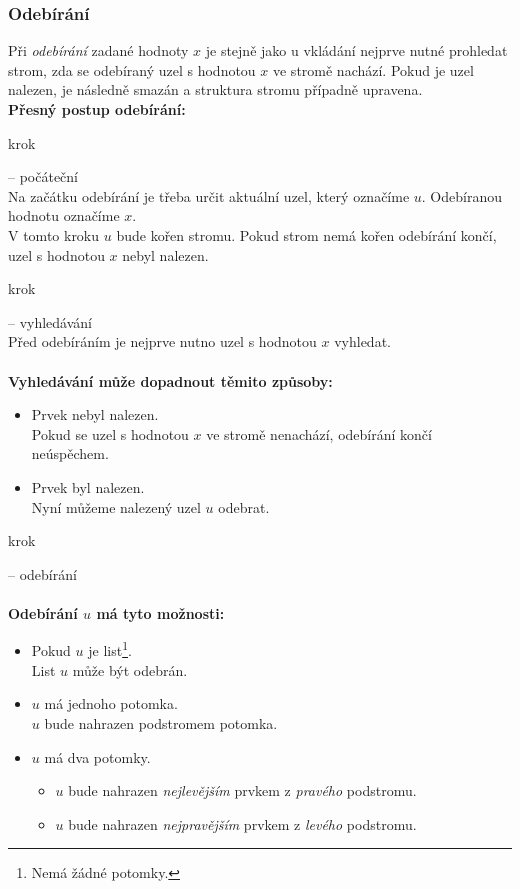 \documentclass[
  biblatex=false,
  font=serif,
  glossaries=false,
  tables=false,
  theorems=false,
  index
]{kidiplom}
\begin{document}
\newpage
\subsubsection{Odebírání}
\indent\indent Při \textit{odebírání} zadané hodnoty $x$ je stejně jako u vkládání nejprve nutné prohledat strom, zda se odebíraný uzel s hodnotou $x$ ve stromě nachází. Pokud je uzel nalezen, je následně smazán a struktura stromu případně upravena.\\

\noindent \textbf{Přesný postup odebírání:}
\begin{enumerate} {\bfseries
\item  krok} -- počáteční \\
Na začátku odebírání je třeba určit aktuální uzel, který označíme $u$. Odebíranou hodnotu označíme $x$.\\
V tomto kroku $u$ bude kořen stromu. Pokud strom nemá kořen odebírání končí, uzel s hodnotou $x$ nebyl nalezen.
{\bfseries\item  krok} -- vyhledávání \\
Před odebíráním je nejprve nutno uzel s hodnotou $x$ vyhledat.\\\\
\textbf{Vyhledávání může dopadnout těmito způsoby:}
\begin{itemize}
\item Prvek nebyl nalezen. \\
Pokud se uzel s hodnotou $x$ ve stromě nenachází, odebírání končí neúspěchem.
\item Prvek byl nalezen. \\
Nyní můžeme nalezený uzel $u$ odebrat.
\end{itemize}
{\bfseries\item  krok} -- odebírání \\\\
\textbf{Odebírání $u$ má tyto možnosti:}
\begin{itemize}
\item Pokud $u$ je list\footnote{Nemá žádné potomky.}. \\
List $u$ může být odebrán.
\item $u$ má jednoho potomka. \\
$u$ bude nahrazen podstromem potomka.
\item $u$ má dva potomky. 
\begin{itemize}
\item $u$ bude nahrazen \textit{nejlevějším} prvkem z \textit{pravého} podstromu.
\item $u$ bude nahrazen \textit{nejpravějším} prvkem z \textit{levého} podstromu.
\end{itemize}
\end{itemize}
\end{enumerate}
\end{document}
